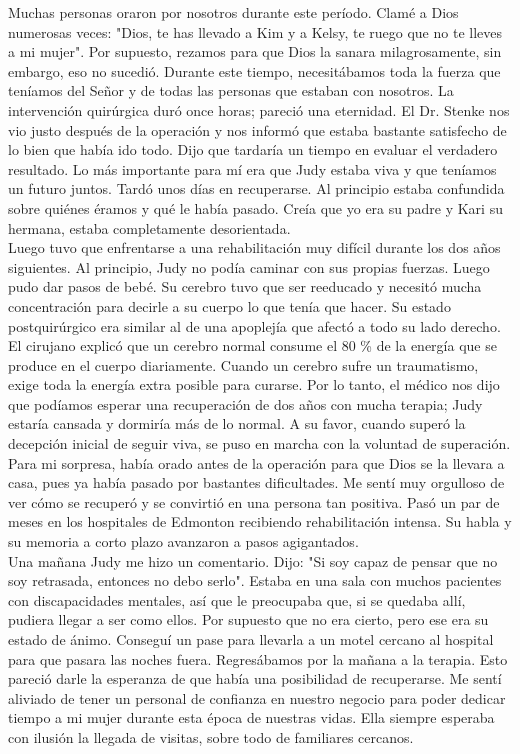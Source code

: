 \documentclass[twoside, 12pt]{book}
\begin{document}
Muchas personas oraron por nosotros durante este período. Clamé a Dios numerosas veces: "Dios, te has llevado a Kim y a Kelsy, te ruego que no te lleves a mi mujer". Por supuesto, rezamos para que Dios la sanara milagrosamente, sin embargo, eso no sucedió. Durante este tiempo, necesitábamos toda la fuerza que teníamos del Señor y de todas las personas que estaban con nosotros. La intervención quirúrgica duró once horas; pareció una eternidad. El Dr. Stenke nos vio justo después de la operación y nos informó que estaba bastante satisfecho de lo bien que había ido todo. Dijo que tardaría un tiempo en evaluar el verdadero resultado. Lo más importante para mí era que Judy estaba viva y que teníamos un futuro juntos. Tardó unos días en recuperarse. Al principio estaba confundida sobre quiénes éramos y qué le había pasado. Creía que yo era su padre y Kari su hermana, estaba completamente desorientada.\\

Luego tuvo que enfrentarse a una rehabilitación muy difícil durante los dos años siguientes. Al principio, Judy no podía caminar con sus propias fuerzas. Luego pudo dar pasos de bebé. Su cerebro tuvo que ser reeducado y necesitó mucha concentración para decirle a su cuerpo lo que tenía que hacer. Su estado postquirúrgico era similar al de una apoplejía que afectó a todo su lado derecho. El cirujano explicó que un cerebro normal consume el 80 \% de la energía que se produce en el cuerpo diariamente. Cuando un cerebro sufre un traumatismo, exige toda la energía extra posible para curarse. Por lo tanto, el médico nos dijo que podíamos esperar una recuperación de dos años con mucha terapia; Judy estaría cansada y dormiría más de lo normal. A su favor, cuando superó la decepción inicial de seguir viva, se puso en marcha con la voluntad de superación. Para mi sorpresa, había orado antes de la operación para que Dios se la llevara a casa, pues ya había pasado por bastantes dificultades. Me sentí muy orgulloso de ver cómo se recuperó y se convirtió en una persona tan positiva. Pasó un par de meses en los hospitales de Edmonton recibiendo rehabilitación intensa. Su habla y su memoria a corto plazo avanzaron a pasos agigantados.\\

Una mañana Judy me hizo un comentario. Dijo: "Si soy capaz de pensar que no soy retrasada, entonces no debo serlo". Estaba en una sala con muchos pacientes con discapacidades mentales, así que le preocupaba que, si se quedaba allí, pudiera llegar a ser como ellos. Por supuesto que no era cierto, pero ese era su estado de ánimo. Conseguí un pase para llevarla a un motel cercano al hospital para que pasara las noches fuera. Regresábamos por la mañana a la terapia. Esto pareció darle la esperanza de que había una posibilidad de recuperarse. Me sentí aliviado de tener un personal de confianza en nuestro negocio para poder dedicar tiempo a mi mujer durante esta época de nuestras vidas. Ella siempre esperaba con ilusión la llegada de visitas, sobre todo de familiares cercanos.\\
\end{document}
